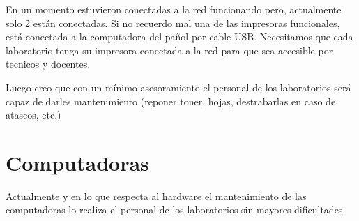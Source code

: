 En un momento estuvieron conectadas a la red funcionando pero, actualmente solo 2 están conectadas. Si no recuerdo mal una de las impresoras funcionales, está conectada a la computadora del pañol por cable USB. 
Necesitamos que cada laboratorio tenga su impresora conectada a la red para que sea accesible por tecnicos y docentes.

Luego creo que con un mínimo asesoramiento el personal de los laboratorios será capaz de darles mantenimiento (reponer toner, hojas, destrabarlas en caso de atascos, etc.)

\section{Computadoras}
Actualmente y en lo que respecta al hardware el mantenimiento de las computadoras lo realiza el personal de los laboratorios sin mayores dificultades.

